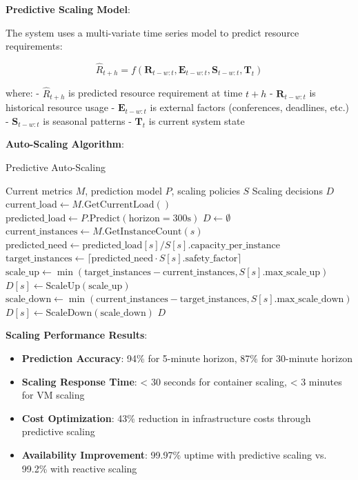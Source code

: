 \documentclass[10pt,twocolumn]{article}
\begin{document}
\textbf{Predictive Scaling Model}:

The system uses a multi-variate time series model to predict resource requirements:

\begin{equation}
\hat{R}_{t+h} = f(\mathbf{R}_{t-w:t}, \mathbf{E}_{t-w:t}, \mathbf{S}_{t-w:t}, \mathbf{T}_t)
\end{equation}

where:
- $\hat{R}_{t+h}$ is predicted resource requirement at time $t+h$
- $\mathbf{R}_{t-w:t}$ is historical resource usage
- $\mathbf{E}_{t-w:t}$ is external factors (conferences, deadlines, etc.)
- $\mathbf{S}_{t-w:t}$ is seasonal patterns
- $\mathbf{T}_t$ is current system state

\textbf{Auto-Scaling Algorithm}:

\begin{algorithm}[H]
\caption{Predictive Auto-Scaling}
\label{alg:auto_scaling}
\begin{algorithmic}[1]
\REQUIRE Current metrics $M$, prediction model $P$, scaling policies $S$
\ENSURE Scaling decisions $D$
\STATE $\text{current\_load} \leftarrow M.\text{GetCurrentLoad}()$
\STATE $\text{predicted\_load} \leftarrow P.\text{Predict}(\text{horizon}=300\text{s})$
\STATE $D \leftarrow \emptyset$
    \STATE $\text{current\_instances} \leftarrow M.\text{GetInstanceCount}(s)$
    \STATE $\text{predicted\_need} \leftarrow \text{predicted\_load}[s] / S[s].\text{capacity\_per\_instance}$
    \STATE $\text{target\_instances} \leftarrow \lceil \text{predicted\_need} \cdot S[s].\text{safety\_factor} \rceil$
        \STATE $\text{scale\_up} \leftarrow \min(\text{target\_instances} - \text{current\_instances}, S[s].\text{max\_scale\_up})$
        \STATE $D[s] \leftarrow \text{ScaleUp}(\text{scale\_up})$
        \STATE $\text{scale\_down} \leftarrow \min(\text{current\_instances} - \text{target\_instances}, S[s].\text{max\_scale\_down})$
        \STATE $D[s] \leftarrow \text{ScaleDown}(\text{scale\_down})$
    \ENDIF
\ENDFOR
\RETURN $D$
\end{algorithmic}
\end{algorithm}

\textbf{Scaling Performance Results}:
\begin{itemize}
    \item \textbf{Prediction Accuracy}: 94\% for 5-minute horizon, 87\% for 30-minute horizon
    \item \textbf{Scaling Response Time}: < 30 seconds for container scaling, < 3 minutes for VM scaling
    \item \textbf{Cost Optimization}: 43\% reduction in infrastructure costs through predictive scaling
    \item \textbf{Availability Improvement}: 99.97\% uptime with predictive scaling vs. 99.2\% with reactive scaling
\end{itemize}
\end{document}
